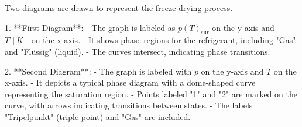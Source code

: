 Two diagrams are drawn to represent the freeze-drying process.  

1. **First Diagram**:  
   - The graph is labeled as \( p(T)_{\text{sur}} \) on the y-axis and \( T \, [K] \) on the x-axis.  
   - It shows phase regions for the refrigerant, including "Gas" and "Flüssig" (liquid).  
   - The curves intersect, indicating phase transitions.  

2. **Second Diagram**:  
   - The graph is labeled with \( p \) on the y-axis and \( T \) on the x-axis.  
   - It depicts a typical phase diagram with a dome-shaped curve representing the saturation region.  
   - Points labeled "1" and "2" are marked on the curve, with arrows indicating transitions between states.  
   - The labels "Tripelpunkt" (triple point) and "Gas" are included.